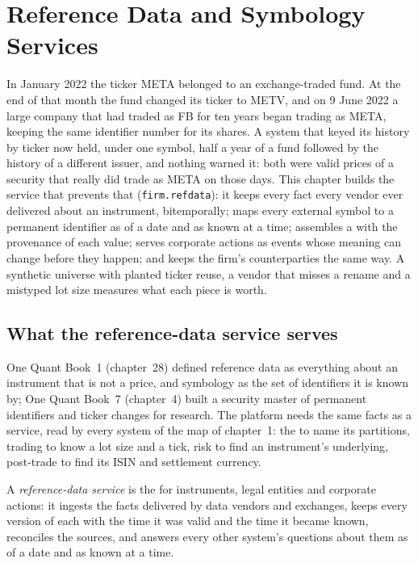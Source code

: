 \chapter{Reference Data and Symbology Services}\label{ch:pl:reference-data-and-symbology-services}

In January 2022 the ticker META belonged to an exchange-traded fund. At the end of that month the fund changed its ticker to
METV, and on 9 June 2022 a large company that had traded as FB for ten years began trading as META, keeping the same identifier
number for its shares. A system that keyed its history by ticker now held, under one symbol, half a year of a fund followed by
the history of a different issuer, and nothing warned it: both were valid prices of a security that really did trade as META on
those days. This chapter builds the service that prevents that (\texttt{firm.refdata}): it keeps every fact every vendor ever
delivered about an instrument, bitemporally; maps every external symbol to a permanent identifier as of a date and as known at a
time; assembles a  with the provenance of each value; serves corporate actions as events whose meaning can change
before they happen; and keeps the firm's counterparties the same way. A synthetic universe with planted ticker reuse, a vendor
that misses a rename and a mistyped lot size measures what each piece is worth.

\section{What the reference-data service serves}

One Quant Book~1 (chapter~28) defined reference data as everything about an instrument that is not a price, and symbology as the
set of identifiers it is known by; One Quant Book~7 (chapter~4) built a security master of permanent identifiers and ticker
changes for research. The platform needs the same facts as a service, read by every system of the map of chapter~1: the  to name its partitions, trading to know a lot size and a tick, risk to find an instrument's underlying, post-trade to find
its ISIN and settlement currency.

\begin{definition}\label{def:pl:reference-data-and-symbology-services:service}
A \emph{reference-data service} is the  for instruments, legal entities and
corporate actions: it ingests the facts delivered by data vendors and exchanges, keeps every version of each with the time it
was valid and the time it became known, reconciles the sources, and answers every other system's questions about them as of a
date and as known at a time.
\end{definition}

